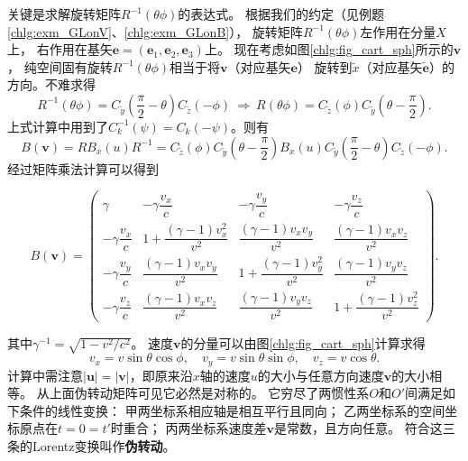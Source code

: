 关键是求解旋转矩阵$R^{-1}({\theta \phi })$的表达式。
根据我们的约定（见例题\ref{chlg:exm_GLonV}、\ref{chlg:exm_GLonB}），
旋转矩阵$R^{-1}({\theta \phi })$左作用在分量$X$上，
右作用在基矢$\boldsymbol{e}=(\boldsymbol{e}_1,\boldsymbol{e}_2,\boldsymbol{e}_3)$上。
现在考虑如图\ref{chlg:fig_cart_sph}所示的$\boldsymbol{v}$，
纯空间固有旋转$R^{-1}({\theta \phi })$相当于将$\boldsymbol{v}$（对应基矢$\boldsymbol{e}$）
旋转到$\tilde{x}$（对应基矢$\tilde{\boldsymbol{e}}$）的方向。不难求得
\begin{equation}\label{chlg:eqn_R-of-bx2b}
    R^{-1}( {\theta \phi } )  = C_{\tilde y}\left({\frac{\pi }{2} -\theta} \right) C_{\tilde z}( -\phi )
    \ \Rightarrow\  R( {\theta \phi } )  =
    {C_{\tilde  z}}(  {\phi } ) {C_{\tilde  y}} \left(  { \theta -\frac{\pi }{2}} \right) .
\end{equation}
上式计算中用到了$C_k^{-1}(\psi)=C_k(-\psi)$。则有
\begin{equation*}
    B\left( \boldsymbol{v} \right) = R{B_x}(u)R^{-1}={C_{\tilde z}}\left(  {\phi } \right)
    {C_{\tilde y}} \left(  { \theta -\frac{\pi }{2}} \right) {B_x} \left( u \right)
    {C_{\tilde y}}\left( {\frac{\pi }{2}-\theta} \right){C_{\tilde z}}\left( -\phi \right) .
\end{equation*}
经过矩阵乘法计算可以得到
\begin{small}
\begin{equation}\label{chlg:eqn_lorentz-matrix-any-v}
    B(\boldsymbol{v}) = \begin{pmatrix}
        \gamma    & -\gamma \dfrac{v_x}{c} & -\gamma \dfrac{v_y}{c} & -\gamma \dfrac{v_z}{c} \\
        -\gamma \dfrac{v_x}{c} & 1+ \dfrac{(\gamma-1)v_x^2}{v^2} &
        \dfrac{(\gamma-1)v_x v_y}{v^2} & \dfrac{(\gamma-1)v_x v_z}{v^2} \\
        -\gamma \dfrac{v_y}{c} & \dfrac{(\gamma-1)v_x v_y}{v^2} &
        1+ \dfrac{(\gamma-1)v_y^2}{v^2} & \dfrac{(\gamma-1)v_y v_z}{v^2} \\
        -\gamma \dfrac{v_z}{c} & \dfrac{(\gamma-1)v_x v_z}{v^2} &
        \dfrac{(\gamma-1)v_y v_z}{v^2} & 1+ \dfrac{(\gamma-1)v_z^2}{v^2}
    \end{pmatrix}.
\end{equation}
\end{small}
其中$\gamma^{-1}=\sqrt{1-v^2/c^2}$。
速度$\boldsymbol{v}$的分量可以由图\ref{chlg:fig_cart_sph}计算求得
\begin{equation}
    {v_x} = v\sin \theta \cos \phi, \quad
    {v_y} = v\sin \theta \sin \phi, \quad
    {v_z} = v\cos \theta  .
\end{equation}
计算中需注意$|\boldsymbol{u}|=|\boldsymbol{v}|$，即原来沿$x$轴的速度$u$的大小与任意方向速度$\boldsymbol{v}$的大小相等。
从上面伪转动矩阵可见它必然是对称的。
它穷尽了两惯性系$O$和$O'$间满足如下条件的线性变换：
\textcircled{\tiny{甲}}两坐标系相应轴是相互平行且同向；
\textcircled{\tiny{乙}}两坐标系的空间坐标原点在$t=0=t'$时重合；
\textcircled{\tiny{丙}}两坐标系速度差$\boldsymbol{v}$是常数，且方向任意。
符合这三条的Lorentz变换叫作\textbf{伪转动}。


